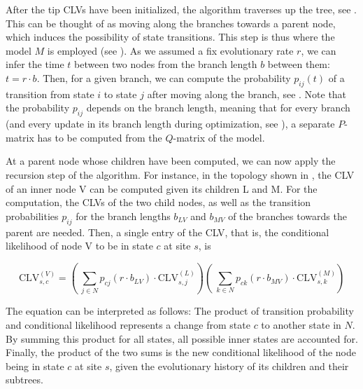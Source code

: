 After the tip CLVs have been initialized, the algorithm traverses up the tree, see .
This can be thought of as moving along the branches towards a parent node,
which induces the possibility of state transitions.
This step is thus where the model $M$ is employed (see ).
As we assumed a fix evolutionary rate $r$,
we can infer the time $t$ between two nodes from the branch length $b$ between them: $t = r \cdot b$.
Then, for a given branch, we can compute the probability $p_{ij}(t)$ of a transition
from state $i$ to state $j$ after moving along the branch, see .
Note that the probability $p_{ij}$ depends on the branch length,
meaning that for every branch (and every update in its branch length during optimization,
see ),
a separate $P$-matrix has to be computed from the $Q$-matrix of the model.

At a parent node whose children have been computed, we can now apply the recursion step of the algorithm.
For instance, in the topology shown in , the CLV of an inner node {\sffamily V}
can be computed given its children {\sffamily L} and {\sffamily M}.
For the computation, the CLVs of the two child nodes,
as well as the transition probabilities $p_{ij}$ for the branch lengths $b_{LV}$ and $b_{MV}$
of the branches towards the parent are needed.
Then, a single entry of the CLV, that is,
the conditional likelihood of node {\sffamily V} to be in state $c$ at site $s$, is

\begin{equation}
    \label{ch:Foundations:sec:MLTreeInference:eq:CLV}
    \mbox{CLV}^{(V)}_{s,c} =
    \left(~ \sum_{j \in N} p_{cj}(r \cdot b_{LV}) \cdot \mbox{CLV}^{(L)}_{s,j} \right)
    \left(~ \sum_{k \in N} p_{ck}(r \cdot b_{MV}) \cdot \mbox{CLV}^{(M)}_{s,k} \right)
\end{equation}

The equation can be interpreted as follows:
The product of transition probability and conditional likelihood represents a change from state $c$ to another state in $N$.
By summing this product for all states, all possible inner states are accounted for.
Finally, the product of the two sums is the new conditional likelihood of the node being in state $c$ at site $s$,
given the evolutionary history of its children and their subtrees.

